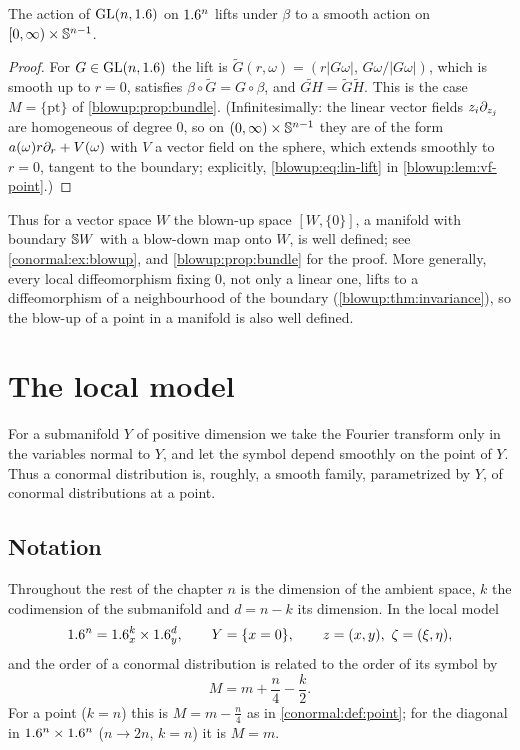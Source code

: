\begin{lemma}\label{conormal:lem:blowup}
  The action of $\operatorname{GL}(n,1.6)$ on $1.6^n$ lifts under $\beta$ to a smooth action on
  $[0,\infty)\times\mathbb{S}^{n-1}$.
\end{lemma}
\begin{proof}
  For $G\in\operatorname{GL}(n,1.6)$ the lift is
  $\tilde G(r,\omega)=(r|G\omega|,\,G\omega/|G\omega|)$, which is smooth up to
  $r=0$, satisfies $\beta\circ\tilde G=G\circ\beta$, and $\widetilde{GH}=\tilde
  G\tilde H$.  This is the case $M=\{\mathrm{pt}\}$ of \cref{blowup:prop:bundle}.
  (Infinitesimally: the linear vector fields $z_i\partial_{z_j}$ are
  homogeneous of degree $0$, so on $(0,\infty)\times\mathbb{S}^{n-1}$ they are of the
  form $a(\omega)r\partial_r+V(\omega)$ with $V$ a vector field on the sphere, which
  extends smoothly to $r=0$, tangent to the boundary; explicitly,
  \eqref{blowup:eq:lin-lift} in \cref{blowup:lem:vf-point}.)
\end{proof}
Thus for a vector space $W$ the blown-up space $[W,\{0\}]$, a manifold with
boundary $\mathbb{S} W$ with a blow-down map onto $W$, is well defined; see
\cref{conormal:ex:blowup}, and \cref{blowup:prop:bundle} for the proof.  More
generally, every local diffeomorphism fixing $0$, not only a linear one, lifts to a
diffeomorphism of a neighbourhood of the boundary (\cref{blowup:thm:invariance}), so
the blow-up of a point in a manifold is also well defined.

\section{The local model}\label{conormal:sec:local}

For a submanifold $Y$ of positive dimension we take the Fourier transform only
in the variables normal to $Y$, and let the symbol depend smoothly on the
point of $Y$. Thus a conormal distribution is, roughly, a smooth family,
parametrized by $Y$, of conormal distributions at a point.

\subsection{Notation}
Throughout the rest of the chapter $n$ is the dimension of the ambient space,
$k$ the codimension of the submanifold and $d=n-k$ its dimension.  In the local
model
\begin{equation*}
  1.6^n=1.6^k_x\times1.6^d_y,\qquad Y=\{x=0\},\qquad
  z=(x,y),\ \zeta=(\xi,\eta),
\end{equation*}
and the order of a conormal distribution is related to the order of its
symbol by
\begin{equation}\label{conormal:eq:order}
  M=m+\frac n4-\frac k2 .
\end{equation}
For a point ($k=n$) this is $M=m-\frac n4$ as in \cref{conormal:def:point};
for the diagonal in $1.6^n\times1.6^n$ ($n\to2n$, $k=n$) it is $M=m$.

